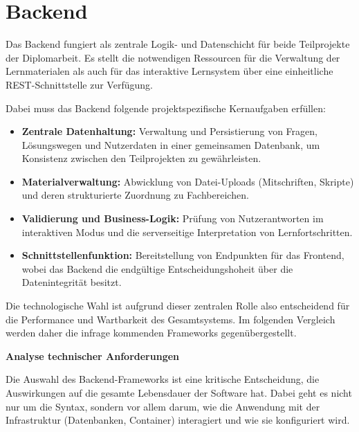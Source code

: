 
\section{Backend}
\setauthor{\firstauthor}

Das Backend fungiert als zentrale Logik- und Datenschicht für beide Teilprojekte der Diplomarbeit. Es stellt die notwendigen Ressourcen für die Verwaltung der Lernmaterialen als auch für das interaktive Lernsystem über eine einheitliche REST-Schnittstelle zur Verfügung.

Dabei muss das Backend folgende projektspezifische Kernaufgaben erfüllen:
\begin{itemize}
	\item \textbf{Zentrale Datenhaltung:} Verwaltung und Persistierung von Fragen, Lösungswegen und Nutzerdaten in einer gemeinsamen Datenbank, um Konsistenz zwischen den Teilprojekten zu gewährleisten.
	\item \textbf{Materialverwaltung:} Abwicklung von Datei-Uploads (Mitschriften, Skripte) und deren strukturierte Zuordnung zu Fachbereichen.
	\item \textbf{Validierung und Business-Logik:} Prüfung von Nutzerantworten im interaktiven Modus und die serverseitige Interpretation von Lernfortschritten.
	\item \textbf{Schnittstellenfunktion:} Bereitstellung von Endpunkten für das Frontend, wobei das Backend die endgültige Entscheidungshoheit über die Datenintegrität besitzt.
\end{itemize}

Die technologische Wahl ist aufgrund dieser zentralen Rolle also entscheidend für die Performance und Wartbarkeit des Gesamtsystems. Im folgenden Vergleich werden daher die infrage kommenden Frameworks gegenübergestellt.


\vspace{1cm}
\textbf{Analyse technischer Anforderungen}
\setauthor{\firstauthor}

Die Auswahl des Backend-Frameworks ist eine kritische Entscheidung, die Auswirkungen auf die gesamte Lebensdauer der Software hat. Dabei geht es nicht nur um die Syntax, sondern vor allem darum, wie die Anwendung mit der Infrastruktur (Datenbanken, Container) interagiert und wie sie konfiguriert wird.

